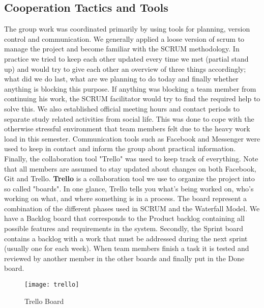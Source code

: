 \subsection{Cooperation Tactics and Tools}

The group work was coordinated primarily by using tools for planning, version control and communication. We generally applied a loose version of scrum to manage the project and become familiar with the SCRUM methodology. In practice we tried to keep each other updated every time we met (partial stand up) and would try to give each other an overview of three things accordingly; what did we do last, what are we planning to do today and finally whether anything is blocking this purpose. If anything was blocking a team member from continuing his work, the SCRUM facilitator would try to find the required help to solve this. 
We also established official meeting hours and contact periods to separate study related activities from social life. This was done to cope with the otherwise stressful environment that team members felt due to the heavy work load in this semester. Communication tools such as Facebook and Messenger were used to keep in contact and inform the group about practical information. Finally, the collaboration tool "Trello"  was used to keep track of everything. Note that all members are assumed to stay updated about changes on both Facebook, Git and Trello. 
\textbf{Trello} is a collaboration tool we use to organize the project into so called "boards". In one glance, Trello tells you what's being worked on, who's working on what, and where something is in a process. The board represent a combination of the different phases used in SCRUM and the Waterfall Model. We have a Backlog board that corresponds to the Product backlog containing all possible features and requirements in the system. Secondly, the Sprint board contains a backlog with a work that must be addressed during the next sprint (usually one for each week). When team members finish a task it is tested and reviewed by another member in the other boards and finally put in the Done board. 

\begin{figure}[H]
	\texttt{[image: trello]}
	\caption{Trello Board}
	\label{fig:trello}
\end{figure}
